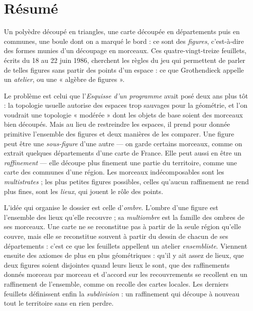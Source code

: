 \documentclass[11pt,a4paper]{article}
\begin{document}
\section*{Résumé}

\begin{resume}
Un polyèdre découpé en triangles, une carte découpée en départements puis en
communes, une boule dont on a marqué le bord : ce sont des \emph{figures},
c'est-à-dire des formes munies d'un découpage en morceaux. Ces
quatre-vingt-treize feuillets, écrits du 18 au 22 juin 1986, cherchent les
règles du jeu qui permettent de parler de telles figures sans partir des
points d'un espace : ce que Grothendieck appelle un \emph{atelier}, ou une
« algèbre de figures ».

Le problème est celui que l'\emph{Esquisse d'un programme} avait posé deux ans
plus tôt : la topologie usuelle autorise des espaces trop sauvages pour la
géométrie, et l'on voudrait une topologie « modérée » dont les objets de base
soient des morceaux bien découpés. Mais au lieu de restreindre les espaces, il
prend pour donnée primitive l'ensemble des figures et deux manières de les
comparer. Une figure peut être une \emph{sous-figure} d'une autre --- on garde
certains morceaux, comme on extrait quelques départements d'une carte de
France. Elle peut aussi en être un \emph{raffinement} --- elle découpe plus finement une partie du territoire, comme une carte des communes d'une région.
Les morceaux indécomposables sont les \emph{multistrates} ; les plus petites
figures possibles, celles qu'aucun raffinement ne rend plus fines, sont les
\emph{lieux}, qui jouent le rôle des points.

L'idée qui organise le dossier est celle d'\emph{ombre}. L'ombre d'une figure
est l'ensemble des lieux qu'elle recouvre ; sa \emph{multiombre} est la
famille des ombres de ses morceaux. Une carte ne se reconstitue pas à partir de
la seule région qu'elle couvre, mais elle se reconstitue souvent à partir du
dessin de chacun de ses départements : c'est ce que les feuillets appellent un
atelier \emph{ensembliste}. Viennent ensuite des axiomes de plus en plus
géométriques : qu'il y ait assez de lieux, que deux figures soient disjointes
quand leurs lieux le sont, que des raffinements donnés morceau par morceau et
d'accord sur les recouvrements se recollent en un raffinement de l'ensemble,
comme on recolle des cartes locales. Les derniers feuillets définissent enfin la
\emph{subdivision} : un raffinement qui découpe à nouveau tout le territoire sans en
rien perdre.


\end{resume}
\end{document}
